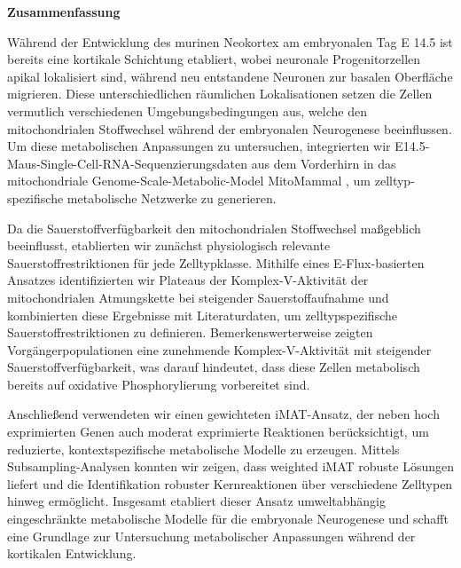 \begin{center}
    \textbf{Zusammenfassung}
\end{center}
\vspace*{1cm}
Während der Entwicklung des murinen Neokortex am embryonalen Tag \gls{E} 14.5 ist bereits eine kortikale Schichtung etabliert, wobei neuronale Progenitorzellen apikal lokalisiert sind, während neu entstandene Neuronen zur basalen Oberfläche migrieren. 
Diese unterschiedlichen räumlichen Lokalisationen setzen die Zellen vermutlich verschiedenen Umgebungsbedingungen aus, welche den mitochondrialen Stoffwechsel während der embryonalen Neurogenese beeinflussen. Um diese metabolischen Anpassungen 
zu untersuchen, integrierten wir E14.5-Maus-Single-Cell-RNA-Sequenzierungsdaten aus dem Vorderhirn 
in das mitochondriale Genome-Scale-Metabolic-Model MitoMammal \citep{CHAPMANMitoMAMMALGenomeScale2025}, um 
zelltyp-spezifische metabolische Netzwerke zu generieren. 
\newline

Da die Sauerstoffverfügbarkeit den mitochondrialen Stoffwechsel maßgeblich beeinflusst, 
etablierten wir zunächst physiologisch relevante Sauerstoffrestriktionen für jede Zelltypklasse.
Mithilfe eines E-Flux-basierten Ansatzes identifizierten wir Plateaus der Komplex-V-Aktivität der mitochondrialen Atmungskette bei steigender Sauerstoffaufnahme und kombinierten diese Ergebnisse mit Literaturdaten, um zelltypspezifische Sauerstoffrestriktionen zu definieren. Bemerkenswerterweise zeigten Vorgängerpopulationen eine zunehmende Komplex-V-Aktivität mit steigender Sauerstoffverfügbarkeit, was darauf hindeutet, dass diese Zellen metabolisch bereits auf oxidative Phosphorylierung vorbereitet sind.
\newline 

Anschließend verwendeten wir einen gewichteten iMAT-Ansatz, der neben hoch exprimierten Genen auch moderat exprimierte Reaktionen berücksichtigt, um reduzierte, kontextspezifische metabolische Modelle zu erzeugen. Mittels Subsampling-Analysen konnten wir zeigen, dass weighted iMAT robuste Lösungen liefert und die Identifikation robuster Kernreaktionen über verschiedene Zelltypen hinweg ermöglicht. Insgesamt etabliert dieser Ansatz umweltabhängig eingeschränkte metabolische Modelle für die embryonale Neurogenese und schafft eine Grundlage zur Untersuchung metabolischer Anpassungen während der kortikalen Entwicklung. 

